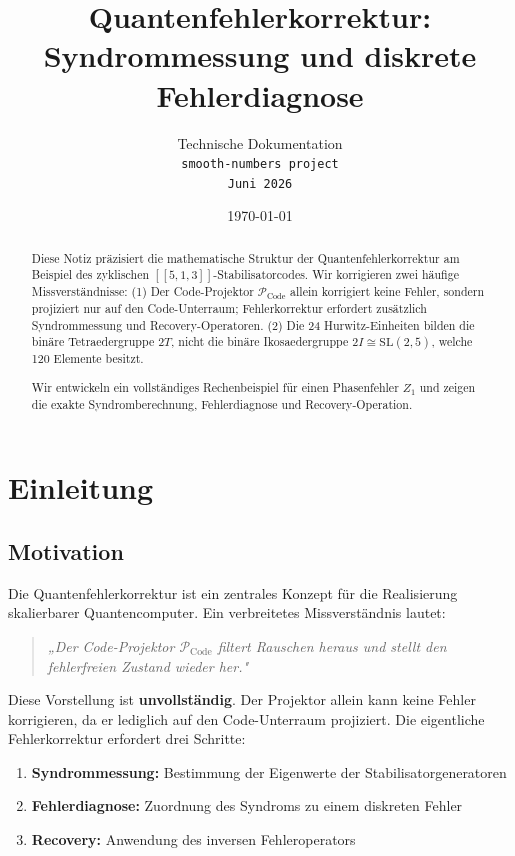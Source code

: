 \documentclass[11pt,a4paper]{article}
\title{Quantenfehlerkorrektur: \\
Syndrommessung und diskrete Fehlerdiagnose}
\author{
Technische Dokumentation \\
\texttt{smooth-numbers project} \\
\texttt{Juni 2026}
}
\date{\today}
\begin{document}
\maketitle

\begin{abstract}
Diese Notiz präzisiert die mathematische Struktur der Quantenfehlerkorrektur am Beispiel des zyklischen $[\![5,1,3]\!]$-Stabilisatorcodes. Wir korrigieren zwei häufige Missverständnisse: (1) Der Code-Projektor $\mathcal{P}_{\text{Code}}$ allein korrigiert keine Fehler, sondern projiziert nur auf den Code-Unterraum; Fehlerkorrektur erfordert zusätzlich Syndrommessung und Recovery-Operatoren. (2) Die 24 Hurwitz-Einheiten bilden die binäre Tetraedergruppe $2T$, nicht die binäre Ikosaedergruppe $2I \cong \text{SL}(2,5)$, welche 120 Elemente besitzt.

Wir entwickeln ein vollständiges Rechenbeispiel für einen Phasenfehler $Z_1$ und zeigen die exakte Syndromberechnung, Fehlerdiagnose und Recovery-Operation.
\end{abstract}

\section{Einleitung}

\subsection{Motivation}

Die Quantenfehlerkorrektur ist ein zentrales Konzept für die Realisierung skalierbarer Quantencomputer. Ein verbreitetes Missverständnis lautet:

\begin{quote}
\textit{„Der Code-Projektor $\mathcal{P}_{\text{Code}}$ filtert Rauschen heraus und stellt den fehlerfreien Zustand wieder her."}
\end{quote}

Diese Vorstellung ist \textbf{unvollständig}. Der Projektor allein kann keine Fehler korrigieren, da er lediglich auf den Code-Unterraum projiziert. Die eigentliche Fehlerkorrektur erfordert drei Schritte:

\begin{enumerate}
\item \textbf{Syndrommessung:} Bestimmung der Eigenwerte der Stabilisatorgeneratoren
\item \textbf{Fehlerdiagnose:} Zuordnung des Syndroms zu einem diskreten Fehler
\item \textbf{Recovery:} Anwendung des inversen Fehleroperators
\end{enumerate}
\end{document}
